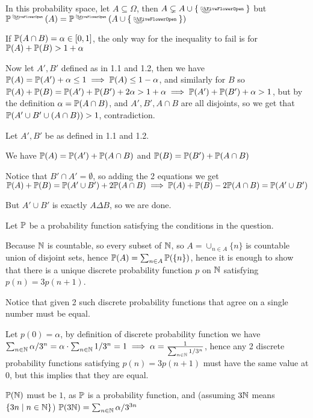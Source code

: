 \begin{cExercise}
\begin{cPart}
		In this probability space, let $A\subseteq\Omega$, then $A\subsetneq A\cup\{\flower\}$ but $\P^{\flower}(A)=\P^{\flower}(A\cup\{\flower\})$
	\end{cPart}
	\begin{cPart}
		If $\P(A\cap B)=\alpha\in[0,1]$, the only way for the inequality to fail is for $\P(A)+\P(B)>1+\alpha$
		
		Now let $A',B'$ defined as in 1.1 and 1.2, then we have $\P(A)=\P(A')+\alpha\le 1\implies \P(A)\le 1-\alpha$, and similarly for $B$ so $\P(A)+\P(B)=\P(A')+\P(B')+2\alpha>1+\alpha\implies \P(A')+\P(B')+\alpha>1$, but by the definition $\alpha=\P(A\cap B)$, and $A',B',A\cap B$ are all disjoints, so we get that $\P(A'\cup B'\cup (A\cap B))>1$, contradiction.
		
	\end{cPart}
	\begin{cPart}
		Let $A',B'$ be as defined in 1.1 and 1.2.
		
		We have $\P(A)=\P(A')+\P(A\cap B)$ and $\P(B)=\P(B')+\P(A\cap B)$
		
		Notice that $B'\cap A'=\emptyset$, so adding the 2 equations we get $\P(A)+\P(B)=\P(A'\cup B')+2\P(A\cap B)\implies \P(A)+\P(B)-2\P(A\cap B)=\P(A'\cup B')$
		
		But $A'\cup B'$ is exactly $A\Delta B$, so we are done.
	\end{cPart}
\end{cExercise}
\begin{cExercise}
	Let $\P$ be a probability function satisfying the conditions in the question.
	
	Because $\N$ is countable, so every subset of $\N$, so $A=\cup_{n\in A}\{n\}$ is countable union of disjoint sets, hence $\P(A)=\sum_{n\in A}\P(\{n\})$, hence it is enough to show that there is a unique discrete probability function $p$ on $\N$ satisfying $p(n)=3p(n+1)$.
	
	Notice that given 2 such discrete probability functions that agree on a single number must be equal.
	
	Let $p(0)=\alpha$, by definition of discrete probability function we have $\sum_{n\in\N}\alpha/3^n=\alpha\cdot \sum_{n\in\N}1/3^n=1\implies \alpha=\frac1{\sum_{n\in\N}1/3^n}$, hence any 2 discrete probability functions satisfying $p(n)=3p(n+1)$ must have the same value at $0$, but this implies that they are equal.
	
	$\P(\N)$ must be $1$, as $\P$ is a probability function, and (assuming $3\N$ means $\{3n\mid n\in\N\}$) $\P(3\N)=\sum_{n\in\N}\alpha/3^{3n}$
\end{cExercise}
